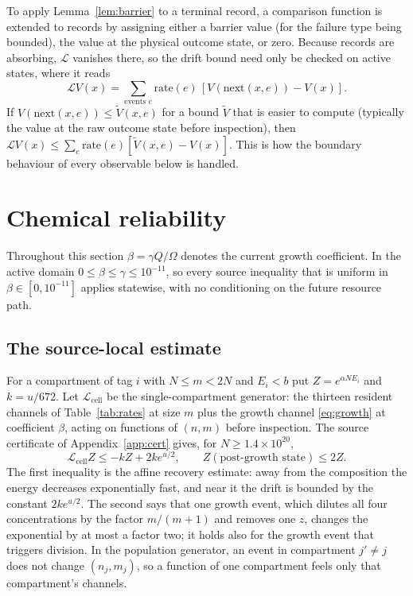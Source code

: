 \documentclass[11pt,a4paper]{article}
\theoremstyle{plain}
\theoremstyle{definition}
\theoremstyle{remark}
\newcommand{\cL}{\mathcal L}
\begin{document}
To apply Lemma~\ref{lem:barrier} to a terminal record, a comparison function is extended to records by assigning either a barrier value (for the failure type being bounded), the value at the physical outcome state, or zero. Because records are absorbing, $\cL$ vanishes there, so the drift bound need only be checked on active states, where it reads
\begin{equation}\label{eq:activedrift}
\cL V(x)=\sum_{\text{events }e}\text{rate}(e)\,[V(\text{next}(x,e))-V(x)].
\end{equation}
If $V(\text{next}(x,e))\leq\widetilde V(x,e)$ for a bound $\widetilde V$ that is easier to compute (typically the value at the raw outcome state before inspection), then $\cL V(x)\leq\sum_e\text{rate}(e)[\widetilde V(x,e)-V(x)]$. This is how the boundary behaviour of every observable below is handled.

\section{Chemical reliability}\label{sec:chemical}

Throughout this section $\beta=\gamma Q/\Omega$ denotes the current growth coefficient. In the active domain $0\leq\beta\leq\gamma\leq10^{-11}$, so every source inequality that is uniform in $\beta\in[0,10^{-11}]$ applies statewise, with no conditioning on the future resource path.

\subsection{The source-local estimate}
For a compartment of tag $i$ with $N\leq m<2N$ and $E_i<b$ put $Z=e^{\alpha NE_i}$ and $k=u/672$. Let $\cL_{\mathrm{cell}}$ be the single-compartment generator: the thirteen resident channels of Table~\ref{tab:rates} at size $m$ plus the growth channel \eqref{eq:growth} at coefficient $\beta$, acting on functions of $(n,m)$ before inspection. The source certificate of Appendix~\ref{app:cert} gives, for $N\geq1.4\times10^{20}$,
\begin{equation}\label{eq:local}
\cL_{\mathrm{cell}}Z\leq-kZ+2ke^{u/2},\qquad Z(\text{post-growth state})\leq2Z .
\end{equation}
The first inequality is the affine recovery estimate: away from the composition the energy decreases exponentially fast, and near it the drift is bounded by the constant $2ke^{u/2}$. The second says that one growth event, which dilutes all four concentrations by the factor $m/(m+1)$ and removes one $z$, changes the exponential by at most a factor two; it holds also for the growth event that triggers division. In the population generator, an event in compartment $j'\neq j$ does not change $(n_j,m_j)$, so a function of one compartment feels only that compartment's channels.
\end{document}
